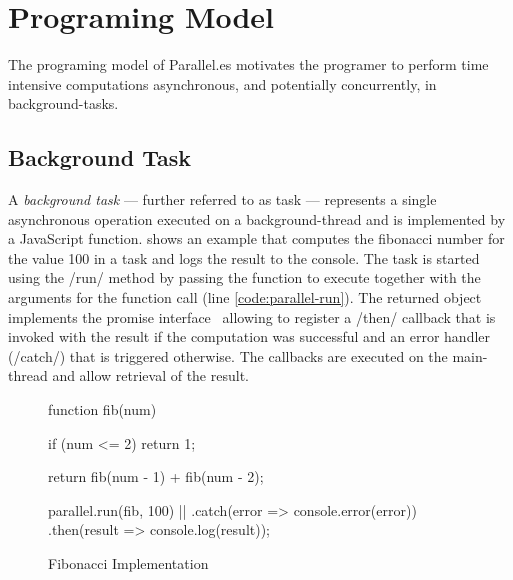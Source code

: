 \section{Programing Model}\label{sec:programing-model}
The programing model of Parallel.es motivates the programer to perform time intensive computations asynchronous, and potentially concurrently, in background-tasks. 

\subsection{Background Task}
A \textit{background task} --- further referred to as task --- represents a single asynchronous operation executed on a background-thread and is implemented by a JavaScript function.  shows an example that computes the fibonacci number for the value 100 in a task and logs the result to the console. The task is started using the \javascriptinline/run/ method by passing the function to execute together with the arguments for the function call (line \ref{code:parallel-run}). The returned object implements the promise interface~\cite[Section 18.3.18]{ecmaScript2015} allowing to register a \javascriptinline/then/ callback that is invoked with the result if the computation was successful and an error handler (\javascriptinline/catch/) that is triggered otherwise. The callbacks are executed on the main-thread and allow retrieval of the result. 


\begin{figure}
	\begin{javascriptcode}
function fib(num) {
	if (num <= 2) {
    	return 1;
	}

	return fib(num - 1) + fib(num - 2);
}
        
parallel.run(fib, 100) |$\label{code:parallel-run}$|
	.catch(error => console.error(error))
	.then(result => console.log(result));	
	\end{javascriptcode}

	\caption{Fibonacci Implementation}
	\label{fig:fibonacci-implementation}
\end{figure}

